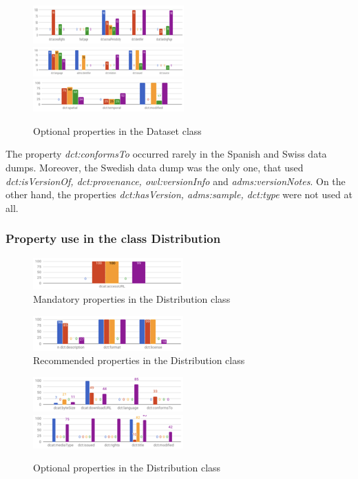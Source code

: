 \documentclass[<options>]{elsarticle}
\begin{document}
\begin{figure}[H]
\includegraphics{replace9.png}
\includegraphics{replace10.png}
\includegraphics{replace11.png}
\caption{Optional properties in the Dataset class}
\end{figure}


The property \textit{dct:conformsTo} occurred rarely in the Spanish and Swiss data dumps. Moreover, the Swedish data dump was the only one, that used \textit{dct:isVersionOf, dct:provenance, owl:versionInfo} and \textit{adms:versionNotes}. On the other hand, the properties  \textit{dct:hasVersion, adms:sample, dct:type} were not used at all.

\subsubsection*{Property use in the class Distribution}

\begin{figure}[H]
\includegraphics{replace12.png}
\caption{Mandatory properties in the Distribution class}
\end{figure}

\begin{figure}[H]
\includegraphics{replace13.png}
\caption{Recommended properties in the Distribution class}
\end{figure}

\begin{figure}[H]
\includegraphics{replace14.png}
\includegraphics{replace15.png}
\caption{Optional properties in the Distribution class}
\end{figure}
\end{document}
